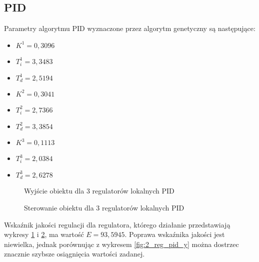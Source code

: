 \subsection{PID}
Parametry algorytmu PID wyznaczone przez algorytm genetyczny są następujące:
\begin{itemize}
\item $K^1 = 0,3096$
\item $T^1_i = 3,3483$
\item $T^1_d = 2,5194$
\\
\item $K^2 = 0,3041$
\item $T^2_i = 2,7366$
\item $T^2_d = 3,3854$
\\
\item $K^3 = 0,1113$
\item $T^3_i = 2,0384$
\item $T^3_d = 2,6278$
\end{itemize}

\begin{figure}[H]
\centering
{}
\caption{Wyjście obiektu dla 3 regulatorów lokalnych PID}
\label{fig:3_reg_pid_y}
\end{figure}

\begin{figure}[H]
\centering
{}
\caption{Sterowanie obiektu dla 3 regulatorów lokalnych PID}
\label{fig:3_reg_pid_u}
\end{figure}

Wskaźnik jakości regulacji dla regulatora, którego działanie przedstawiają wykresy \ref{fig:3_reg_pid_y} i \ref{fig:3_reg_pid_u}, ma wartość $E=93,5945$. Poprawa wskaźnika jakości jest niewielka, jednak porównując z wykresem \ref{fig:2_reg_pid_y} można dostrzec znacznie szybsze osiągnięcia wartości zadanej.

